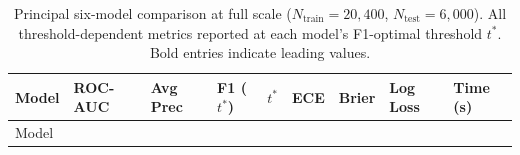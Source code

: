 \documentclass[
  letterpaper,
  DIV=11,
  numbers=noendperiod]{scrartcl}
\begin{document}
\begin{longtable}[]{@{}
  >{\raggedright\arraybackslash}p{}
  >{\centering\arraybackslash}p{}
  >{\centering\arraybackslash}p{}
  >{\centering\arraybackslash}p{}
  >{\centering\arraybackslash}p{}
  >{\centering\arraybackslash}p{}
  >{\centering\arraybackslash}p{}
  >{\centering\arraybackslash}p{}
  >{\centering\arraybackslash}p{}@{}}
\caption{Principal six-model comparison at full scale
(\(N_{\text{train}} = 20{,}400\), \(N_{\text{test}} = 6{,}000\)). All
threshold-dependent metrics reported at each model's F1-optimal
threshold \(t^*\). Bold entries indicate leading
values.}\label{tbl-fm-large}\tabularnewline
\toprule\noalign{}
\begin{minipage}[b]{\linewidth}\raggedright
Model
\end{minipage} & \begin{minipage}[b]{\linewidth}\centering
ROC-AUC
\end{minipage} & \begin{minipage}[b]{\linewidth}\centering
Avg Prec
\end{minipage} & \begin{minipage}[b]{\linewidth}\centering
F1 (\(t^*\))
\end{minipage} & \begin{minipage}[b]{\linewidth}\centering
\(t^*\)
\end{minipage} & \begin{minipage}[b]{\linewidth}\centering
ECE
\end{minipage} & \begin{minipage}[b]{\linewidth}\centering
Brier
\end{minipage} & \begin{minipage}[b]{\linewidth}\centering
Log Loss
\end{minipage} & \begin{minipage}[b]{\linewidth}\centering
Time (s)
\end{minipage} \\
\midrule\noalign{}
\endfirsthead
\toprule\noalign{}
\begin{minipage}[b]{\linewidth}\raggedright
Model
\end{minipage} & \begin{minipage}[b]{\linewidth}\centering

\end{minipage}
\end{longtable}
\end{document}
